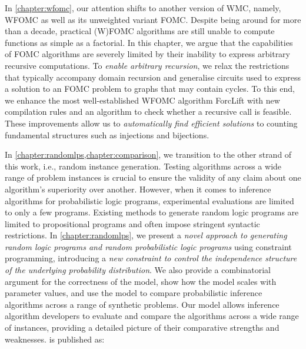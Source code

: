 
In \cref{chapter:wfomc}, our attention shifts to another version of WMC, namely, WFOMC as well as its unweighted variant FOMC. Despite being around for more than a decade, practical (W)FOMC algorithms are still unable to compute functions as simple as a factorial. In this chapter, we argue that the capabilities of FOMC algorithms are severely limited by their inability to express arbitrary recursive computations. To \emph{enable arbitrary recursion}, we relax the restrictions that typically accompany domain recursion and generalise circuits used to express a solution to an FOMC problem to graphs that may contain cycles. To this end, we enhance the most well-established WFOMC algorithm ForcLift \citep{DBLP:conf/ijcai/BroeckTMDR11} with new compilation rules and an algorithm to check whether a recursive call is feasible. These improvements allow us to \emph{automatically find efficient solutions} to counting fundamental structures such as injections and bijections.


In \cref{chapter:randomlps,chapter:comparison}, we transition to the other strand of this work, i.e., random instance generation. Testing algorithms across a wide range of problem instances is crucial to ensure the validity of any claim about one algorithm's superiority over another. However, when it comes to inference algorithms for probabilistic logic programs, experimental evaluations are limited to only a few programs. Existing methods to generate random logic programs are limited to propositional programs and often impose stringent syntactic restrictions. In \cref{chapter:randomlps}, we present a \emph{novel approach to generating random logic programs and random probabilistic logic programs} using constraint programming, introducing a \emph{new constraint to control the independence structure of the underlying probability distribution}. We also provide a combinatorial argument for the correctness of the model, show how the model scales with parameter values, and use the model to compare probabilistic inference algorithms across a range of synthetic problems. Our model allows inference algorithm developers to evaluate and compare the algorithms across a wide range of instances, providing a detailed picture of their comparative strengths and weaknesses.  is published as:
\begin{displayquote}
\end{displayquote}

